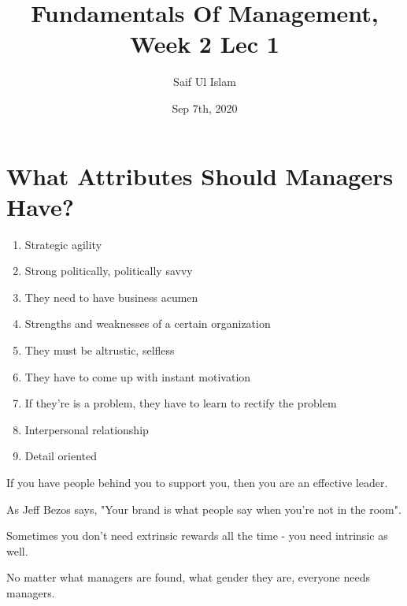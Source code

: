 \documentclass{article}
\author{Saif Ul Islam}
\date{Sep 7th, 2020}
\title{Fundamentals Of Management, Week 2 Lec 1}
\begin{document}
    
    \maketitle

    \tableofcontents

    \section{What Attributes Should Managers Have?}

    \begin{enumerate}
        \item Strategic agility
        \item Strong politically, politically savvy
        \item They need to have business acumen
        \item Strengths and weaknesses of a certain organization
        \item They must be altrustic, selfless
        \item They have to come up with instant motivation
        \item If they're is a problem, they have to learn to rectify the problem
        \item Interpersonal relationship
        \item Detail oriented
    \end{enumerate}

    If you have people behind you to support you, then you are an effective leader.

    As Jeff Bezos says, "Your brand is what people say when you're not in the room".

    Sometimes you don't need extrinsic rewards all the time - you need intrinsic as well. 

    No matter what managers are found, what gender they are, everyone needs managers.
\end{document}
